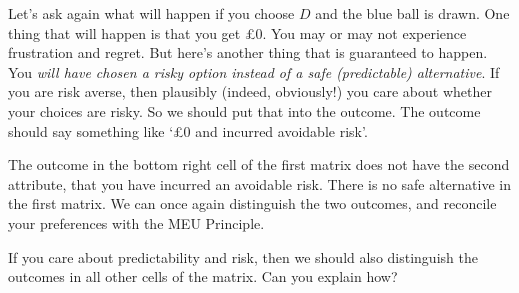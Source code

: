 Let's ask again what will happen if you choose $D$ and the blue ball is drawn.
One thing that will happen is that you get £0. You may or may not experience
frustration and regret. But here's another thing that is guaranteed to happen.
You \emph{will have chosen a risky option instead of a safe (predictable)
  alternative}. If you are risk averse, then plausibly (indeed, obviously!) you
care about whether your choices are risky. So we should put that into the
outcome. The outcome should say something like `£0 and incurred avoidable risk'.

The outcome in the bottom right cell of the first matrix does not have the
second attribute, that you have incurred an avoidable risk. There is no safe
alternative in the first matrix. We can once again distinguish the two outcomes,
and reconcile your preferences with the MEU Principle.

\begin{exercise}{1}
  If you care about predictability and risk, then we should also distinguish the
  outcomes in all other cells of the matrix. Can you explain how?
\end{exercise}


%


